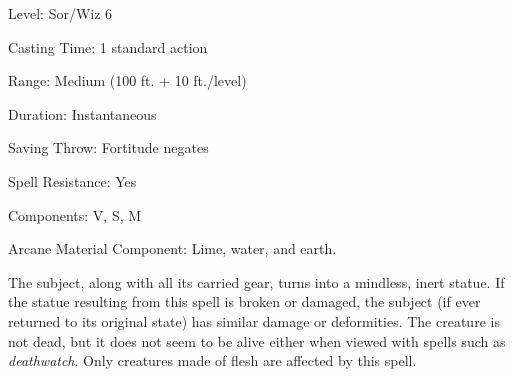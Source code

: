 
\begin{description*}
\item[Level:] Sor/Wiz 6
\item[Casting Time:] 1 standard action
\item[Range:] Medium (100 ft. + 10 ft./level)
\item[Duration:] Instantaneous
\item[Saving Throw:] Fortitude negates
\item[Spell Resistance:] Yes
\item[Components:] V, S, M
\item[Arcane Material Component:] Lime, water, and earth.
\end{description*}

The subject, along with all its carried gear, turns into a mindless, inert statue.
If the statue resulting from this spell is broken or damaged, the subject (if ever
returned to its original state) has similar damage or deformities. The creature
is not dead, but it does not seem to be alive either when viewed with spells such
as \textit{deathwatch}.
Only creatures made of flesh are affected by this spell.